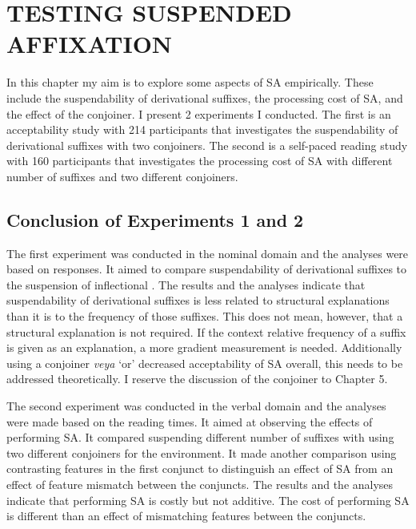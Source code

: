 \chapter{\MakeUppercase{testing suspended affixation}} \label{sec:testing}


In this chapter my aim is to explore some aspects of SA empirically. These include the suspendability of derivational suffixes, the processing cost of SA, and the effect of the conjoiner. I present 2 experiments I conducted. The first is an acceptability study with 214 participants that investigates the suspendability of derivational suffixes with two conjoiners. The second is a self-paced reading study with 160 participants that investigates the processing cost of SA with different number of suffixes and two different conjoiners.






\section{Conclusion of Experiments 1 and 2}

The first experiment was conducted in the nominal domain and the analyses were based on responses. It aimed to compare suspendability of derivational suffixes to the suspension of inflectional {\Acc}. The results and the analyses indicate that suspendability of derivational suffixes is less related to structural explanations than it is to the frequency of those suffixes. This does not mean, however, that a structural explanation is not required. If the context relative frequency of a suffix is given as an explanation, a more gradient measurement is needed. Additionally using a conjoiner \textit{veya} `or' decreased acceptability of SA overall, this needs to be addressed theoretically. I reserve the discussion of the conjoiner to Chapter 5.


The second experiment was conducted in the verbal domain and the analyses were made based on the reading times. It aimed at observing the effects of performing SA. It compared suspending different number of suffixes with using two different conjoiners for the environment. It made another comparison using contrasting features in the first conjunct to distinguish an effect of SA from an effect of feature mismatch between the conjuncts. The results and the analyses indicate that performing SA is costly but not additive. The cost of performing SA is different than an effect of mismatching features between the conjuncts. 









